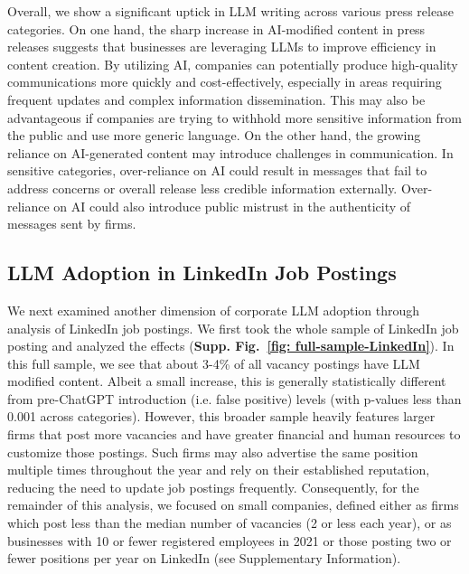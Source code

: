 Overall, we show a significant uptick in LLM writing across various press release categories. On one hand, the sharp increase in AI-modified content in press releases suggests that businesses are leveraging LLMs to improve efficiency in content creation. By utilizing AI, companies can potentially produce high-quality communications more quickly and cost-effectively, especially in areas requiring frequent updates and complex information dissemination. This may also be advantageous if companies are trying to withhold more sensitive information from the public and use more generic language. On the other hand, the growing reliance on AI-generated content may introduce challenges in communication. In sensitive categories, over-reliance on AI could result in messages that fail to address concerns or overall release less credible information externally. Over-reliance on AI could also introduce public mistrust in the authenticity of messages sent by firms.


\subsection*{LLM Adoption in LinkedIn Job Postings}


We next examined another dimension of corporate LLM adoption through analysis of LinkedIn job postings.
We first took the whole sample of LinkedIn job posting and analyzed the effects (\textbf{Supp. Fig.~\ref{fig: full-sample-LinkedIn}}). In this full sample, we see that about 3-4\% of all vacancy postings have LLM modified content. Albeit a small increase, this is generally statistically different from pre-ChatGPT introduction (i.e. false positive) levels (with p-values less than 0.001 across categories).  However, this broader sample heavily features larger firms that post more vacancies and have greater financial and human resources to customize those postings. Such firms may also advertise the same position multiple times throughout the year and rely on their established reputation, reducing the need to update job postings frequently. Consequently, for the remainder of this analysis, we focused on small companies, defined either as firms which post less than the median number of vacancies (2 or less each year), or as businesses with 10 or fewer registered employees in 2021 or those posting two or fewer positions per year on LinkedIn (see Supplementary Information).


